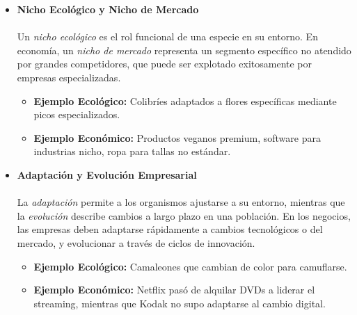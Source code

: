 \documentclass[a4paper,12pt]{article}
\begin{document}
\begin{itemize}
    \begin{itemize}
        \item \textbf{Ejemplo Ecológico:} Abejas y flores: polinización a cambio de néctar.
        \item \textbf{Ejemplo Económico:} Starbucks y Spotify: colaboración para curar música en tiendas y aumentar lealtad mutua de clientes.
    \end{itemize}

    \item \textbf{Nicho Ecológico y Nicho de Mercado}

    \paragraph{}Un \textit{nicho ecológico} es el rol funcional de una especie en su entorno. En economía, un \textit{nicho de mercado} representa un segmento específico no atendido por grandes competidores, que puede ser explotado exitosamente por empresas especializadas.

    \begin{itemize}
        \item \textbf{Ejemplo Ecológico:} Colibríes adaptados a flores específicas mediante picos especializados.
        \item \textbf{Ejemplo Económico:} Productos veganos premium, software para industrias nicho, ropa para tallas no estándar.
    \end{itemize}

    \item \textbf{Adaptación y Evolución Empresarial}

    \paragraph{}La \textit{adaptación} permite a los organismos ajustarse a su entorno, mientras que la \textit{evolución} describe cambios a largo plazo en una población. En los negocios, las empresas deben adaptarse rápidamente a cambios tecnológicos o del mercado, y evolucionar a través de ciclos de innovación.

    \begin{itemize}
        \item \textbf{Ejemplo Ecológico:} Camaleones que cambian de color para camuflarse.
        \item \textbf{Ejemplo Económico:} Netflix pasó de alquilar DVDs a liderar el streaming, mientras que Kodak no supo adaptarse al cambio digital.
    \end{itemize}
\end{itemize}
\end{document}
